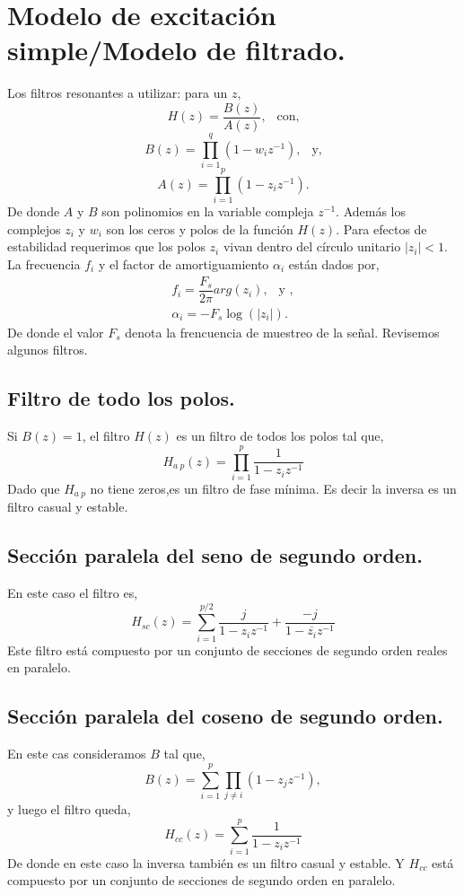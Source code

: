 \documentclass[11pt]{amsart}
\theoremstyle{plain}
\theoremstyle{definition}
\begin{document}
\section{Modelo de excitación simple/Modelo de filtrado.}
Los filtros resonantes a utilizar: para un $z$,
$$
H(z)=\frac{B(z)}{A(z)}, \ \ \text{ con,}
$$
$$
B(z)= \prod_{i=1}^{q}(1-w_iz^{-1}), \ \ \text{ y,}
$$
$$
A(z)=\prod_{i=1}^{p}(1-z_iz^{-1}).
$$
De donde $A$ y $B$ son polinomios en la variable compleja $z^{-1}$. Además los complejos $z_i$ y $w_i$ son los ceros y polos de la función $H(z)$. Para efectos de estabilidad requerimos que los polos $z_i$ vivan dentro del círculo unitario $|z_i|<1$. \\
La frecuencia $f_i$ y el factor de amortiguamiento $\alpha_i$ están dados por,
\begin{eqnarray}
f_i=\dfrac{F_s}{2 \pi} arg(z_i), \ \ \text{ y }, \\
\alpha_i = -F_s \log(|z_i|).
\end{eqnarray}
De donde el valor $F_s$ denota la frencuencia de muestreo de la señal. Revisemos algunos filtros.
\subsection{Filtro de todo los polos.}
Si $B(z)=1$, el filtro $H(z)$ es un filtro de todos los polos tal que,
$$
H_{a\ p} (z) = \prod_{i=1}^{p} \dfrac{1}{1-z_iz^{-1}}
$$
Dado que $H_{a \ p}$ no tiene zeros,es un filtro de fase mínima. Es decir la inversa es un filtro casual y estable.
\subsection{Sección paralela del seno de segundo orden.}
En este caso el filtro es,
$$
H_{sc}(z)=\sum_{i=1}^{p/2} \dfrac{j}{1-z_iz^{-1}}+\dfrac{-j}{1-\overline{z_i}z^{-1}}
$$
Este filtro está compuesto por un conjunto de secciones de segundo orden reales en paralelo.
\subsection{Sección paralela del coseno de segundo orden.}
En este cas  consideramos $B$ tal que,
$$
B(z) = \sum_{i=1}^p \prod_{j \neq i} (1-z_jz^{-1}),
$$
y luego el filtro queda,
$$
H_{cc}(z) = \sum_{i=1}^{p} \dfrac{1}{1-z_iz^{-1}}
$$
De donde en este caso la inversa también es un filtro casual y estable. Y $H_{cc}$ está compuesto por un conjunto de secciones de segundo orden en paralelo.
\end{document}
